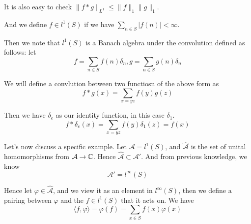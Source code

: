 It is also easy to check $\|f\ast g\|_{L^1}\leq\|f\|_1\|g\|_1$.



And we define $f\in l^1(S)$ if we have $\sum_{n\in S}|f(n)|<\infty$.

Then we note that $l^1(S)$ is a Banach algebra under the convolution defined as follows: let 
\begin{equation*}
    f=\sum_{n\in S}f(n)\delta_n, g=\sum_{n\in S}g(n)\delta_n
\end{equation*}

\begin{definition}[Convolution]
    We will define a convlution between two functiosn of the above form as 
    \begin{equation*}
        f\ast g(x)=\sum_{x=yz}f(y)g(z)
    \end{equation*}
\end{definition}

Then we have $\delta_e$ as our identity function, in this case $\delta_1$.
\begin{equation*}
    f\ast\delta_e(x)=\sum_{x=yz}f(y)\delta_1(z)=f(x)
\end{equation*}

Let's now discuss a specific example. Let $\mathcal{A}=l^1(S)$, and $\widehat{\mathcal{A}}$ is the set of unital homomorphisms from $\mathcal{A}\to\mathbb{C}$. Hence $\widehat{\mathcal{A}}\subset\mathcal{A}'$. And from previous knowledge, we know
\begin{equation*}
    \mathcal{A}'=l^\infty(S)
\end{equation*}

Hence let $\varphi\in\widehat{\mathcal{A}}$, and we view it as an element in $l^\infty(S)$, then we define a pairing between $\varphi$ and the $f\in l^1(S)$ that it acts on. We have
\begin{equation*}
    \langle f,\varphi \rangle =\varphi(f)=\sum_{x\in S}f(x)\varphi(x)
\end{equation*}

